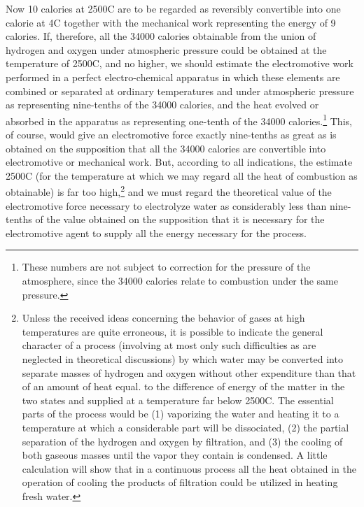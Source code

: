\documentclass[12pt]{memoir}
\begin{document}
Now 10 calories at 2500\degree C are to be regarded as reversibly convertible into one calorie at 4\degree C together with the mechanical work representing the energy of 9 calories. If, therefore, all the 34000 calories obtainable from the union of hydrogen and oxygen under atmospheric pressure could be obtained at the temperature of
2500\degree C, and no higher, we should estimate the electromotive work performed in a perfect electro-chemical apparatus in which these elements are combined or separated at ordinary temperatures and under atmospheric pressure as representing nine-tenths of the 34000 calories, and the heat evolved or absorbed in the apparatus as representing one-tenth of the 34000 calories.\footnote{These numbers are not subject to correction for the pressure of the atmosphere, since the 34000 calories relate to combustion under the same pressure.} This, of course, would give an electromotive force exactly nine-tenths as great as is obtained on the supposition that all the 34000 calories are convertible into electromotive or mechanical work. But, according to all indications, the estimate 2500\degree C (for the temperature at which we may regard all the heat of combustion as obtainable) is far too high,\footnote{Unless the received ideas concerning the behavior of gases at high temperatures are quite erroneous, it is possible to indicate the general character of a process (involving at most only such difficulties as are neglected in theoretical discussions) by which water may be converted into separate masses of hydrogen and oxygen without other expenditure than that of an amount of heat equal. to the difference of energy of the matter in the two states and supplied at a temperature far below 2500\degree C. The essential parts of the process would be (1) vaporizing the water and heating it to a temperature at which a considerable part will be dissociated, (2) the partial separation of the hydrogen and oxygen by filtration, and (3) the cooling of both gaseous masses until the vapor they contain is condensed. A little calculation will show that in a continuous process all the heat obtained in the operation of cooling the products of filtration could be utilized in heating fresh water.}
and we must regard the theoretical value of the electromotive force necessary to electrolyze water as considerably less than nine-tenths of the value obtained on the supposition that it is necessary for the electromotive agent to supply all the energy necessary for the process.
\end{document}
